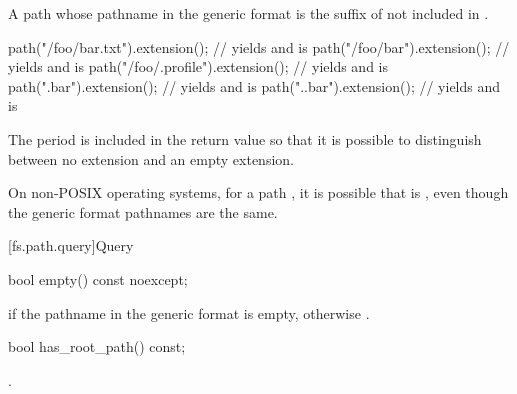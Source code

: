 \begin{itemdescr}
\pnum
\returns
A path whose pathname in the generic format is
the suffix of  not included in .

\pnum
\begin{example}
\begin{codeblock}
path("/foo/bar.txt").extension();       // yields  and  is 
path("/foo/bar").extension();           // yields  and  is 
path("/foo/.profile").extension();      // yields  and  is 
path(".bar").extension();               // yields  and  is 
path("..bar").extension();              // yields  and  is 
\end{codeblock}
\end{example}

\pnum
\begin{note}
The period is included in the return value so that it is
  possible to distinguish between no extension and an empty extension.
\end{note}

\pnum
\begin{note}
On non-POSIX operating systems, for a path ,
it is possible that  is ,
even though the generic format pathnames are the same.
\end{note}
\end{itemdescr}

[fs.path.query]{Query}

%
\begin{itemdecl}
bool empty() const noexcept;
\end{itemdecl}

\begin{itemdescr}
\pnum
\returns
{} if the pathname in the generic format is empty, otherwise .
\end{itemdescr}

%
\begin{itemdecl}
bool has_root_path() const;
\end{itemdecl}

\begin{itemdescr}
\pnum
\returns
{}.
\end{itemdescr}

